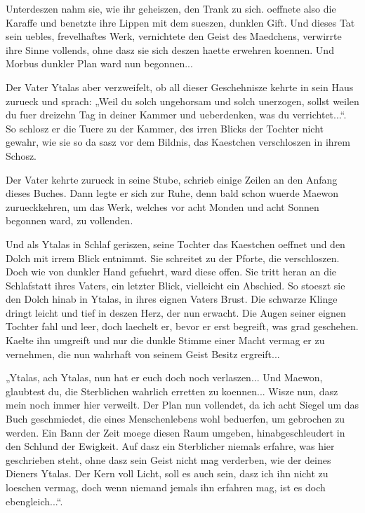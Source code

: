 \documentclass[a5paper,8pt]{book}
\begin{document}
Unterdeszen nahm sie, wie ihr geheiszen, den Trank zu sich. oeffnete also die Karaffe und benetzte ihre Lippen mit dem sueszen, dunklen Gift. Und dieses Tat sein uebles, frevelhaftes Werk, vernichtete den Geist des Maedchens, verwirrte ihre Sinne vollends, ohne dasz sie sich deszen haette erwehren koennen. Und Morbus dunkler Plan ward nun begonnen...

Der Vater Ytalas aber verzweifelt, ob all dieser Geschehnisze kehrte in sein Haus zurueck und sprach: „Weil du solch ungehorsam und solch unerzogen, sollst weilen du fuer dreizehn Tag in deiner Kammer und ueberdenken, was du verrichtet...“. So schlosz er die Tuere zu der Kammer, des irren Blicks der Tochter nicht gewahr, wie sie so da sasz vor dem Bildnis, das Kaestchen verschloszen in ihrem Schosz.

Der Vater kehrte zurueck in seine Stube, schrieb einige Zeilen an den Anfang dieses Buches. Dann legte er sich zur Ruhe, denn bald schon wuerde Maewon zurueckkehren, um das Werk, welches vor acht Monden und acht Sonnen begonnen ward, zu vollenden.

Und als Ytalas in Schlaf geriszen, seine Tochter das Kaestchen oeffnet und den Dolch mit irrem Blick entnimmt. Sie schreitet zu der Pforte, die verschloszen. Doch wie von dunkler Hand gefuehrt, ward diese offen. Sie tritt heran an die Schlafstatt ihres Vaters, ein letzter Blick, vielleicht ein Abschied. So stoeszt sie den Dolch hinab in Ytalas, in ihres eignen Vaters Brust. Die schwarze Klinge dringt leicht und tief in deszen Herz, der nun erwacht. Die Augen seiner eignen Tochter fahl und leer, doch laechelt er, bevor er erst begreift, was grad geschehen. Kaelte ihn umgreift und nur die dunkle Stimme einer Macht vermag er zu vernehmen, die nun wahrhaft von seinem Geist Besitz ergreift...

„Ytalas, ach Ytalas, nun hat er euch doch noch verlaszen... Und Maewon, glaubtest du, die Sterblichen wahrlich erretten zu koennen... Wisze nun, dasz mein noch immer hier verweilt. Der Plan nun vollendet, da ich acht Siegel um das Buch geschmiedet, die eines Menschenlebens wohl beduerfen, um gebrochen zu werden. Ein Bann der Zeit moege diesen Raum umgeben, hinabgeschleudert in den Schlund der Ewigkeit. Auf dasz ein Sterblicher niemals erfahre, was hier geschrieben steht, ohne dasz sein Geist nicht mag verderben, wie der deines Dieners Ytalas. Der Kern voll Licht, soll es auch sein, dasz ich ihn nicht zu loeschen vermag, doch wenn niemand jemals ihn erfahren mag, ist es doch ebengleich...“.
\end{document}
